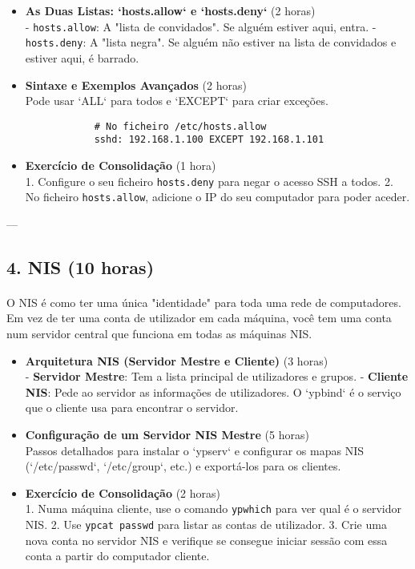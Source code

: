 \documentclass[10pt,a4paper]{article}
\begin{document}
	\begin{itemize}
		\item \textbf{As Duas Listas: `hosts.allow` e `hosts.deny`} (2 horas) \\
		- \texttt{hosts.allow}: A "lista de convidados". Se alguém estiver aqui, entra.
		- \texttt{hosts.deny}: A "lista negra". Se alguém não estiver na lista de convidados e estiver aqui, é barrado.
		
		\item \textbf{Sintaxe e Exemplos Avançados} (2 horas) \\
		Pode usar `ALL` para todos e `EXCEPT` para criar exceções.
		\begin{verbatim}
			# No ficheiro /etc/hosts.allow
			sshd: 192.168.1.100 EXCEPT 192.168.1.101
		\end{verbatim}
		
		\item \textbf{Exercício de Consolidação} (1 hora) \\
		1. Configure o seu ficheiro \texttt{hosts.deny} para negar o acesso SSH a todos.
		2. No ficheiro \texttt{hosts.allow}, adicione o IP do seu computador para poder aceder.
	\end{itemize}
	
	---
	
	\subsection*{4. NIS (10 horas)}
	\vspace{-1.2em}
	\paragraph{}
	O NIS é como ter uma única "identidade" para toda uma rede de computadores. Em vez de ter uma conta de utilizador em cada máquina, você tem uma conta num servidor central que funciona em todas as máquinas NIS.
	
	\begin{itemize}
		\item \textbf{Arquitetura NIS (Servidor Mestre e Cliente)} (3 horas) \\
		- \textbf{Servidor Mestre}: Tem a lista principal de utilizadores e grupos.
		- \textbf{Cliente NIS}: Pede ao servidor as informações de utilizadores. O `ypbind` é o serviço que o cliente usa para encontrar o servidor.
		
		\item \textbf{Configuração de um Servidor NIS Mestre} (5 horas) \\
		Passos detalhados para instalar o `ypserv` e configurar os mapas NIS (`/etc/passwd`, `/etc/group`, etc.) e exportá-los para os clientes.
		
		\item \textbf{Exercício de Consolidação} (2 horas) \\
		1. Numa máquina cliente, use o comando \texttt{ypwhich} para ver qual é o servidor NIS.
		2. Use \texttt{ypcat passwd} para listar as contas de utilizador.
		3. Crie uma nova conta no servidor NIS e verifique se consegue iniciar sessão com essa conta a partir do computador cliente.
	\end{itemize}
	
\end{document}
